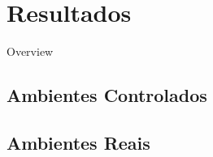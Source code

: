 \newpage\null\thispagestyle{empty}\newpage
\chapter{Resultados}
\label{chap:result}

Overview

\section{Ambientes Controlados}


\section{Ambientes Reais}




